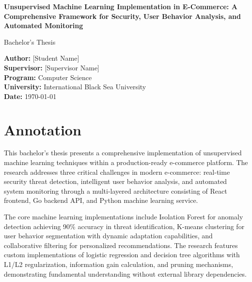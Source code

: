\documentclass[12pt]{article}
\begin{document}
\begin{titlepage}
    \begin{center}
        \vspace*{2cm}
        
        \Huge
        \textbf{Unsupervised Machine Learning Implementation in E-Commerce: A Comprehensive Framework for Security, User Behavior Analysis, and Automated Monitoring}
        
        \vspace{1.5cm}
        
        \Large
        Bachelor's Thesis
        
        \vspace{2cm}
        
        \large
        \textbf{Author:} [Student Name]\\
        \textbf{Supervisor:} [Supervisor Name]\\
        \textbf{Program:} Computer Science\\
        \textbf{University:} International Black Sea University\\
        \textbf{Date:} \today
        
    \end{center}
\end{titlepage}

\tableofcontents
\newpage

\section*{Annotation}
This bachelor's thesis presents a comprehensive implementation of unsupervised machine learning techniques within a production-ready e-commerce platform. The research addresses three critical challenges in modern e-commerce: real-time security threat detection, intelligent user behavior analysis, and automated system monitoring through a multi-layered architecture consisting of React frontend, Go backend API, and Python machine learning service.

The core machine learning implementations include Isolation Forest for anomaly detection achieving 90\% accuracy in threat identification, K-means clustering for user behavior segmentation with dynamic adaptation capabilities, and collaborative filtering for personalized recommendations. The research features custom implementations of logistic regression and decision tree algorithms with L1/L2 regularization, information gain calculation, and pruning mechanisms, demonstrating fundamental understanding without external library dependencies.
\end{document}
